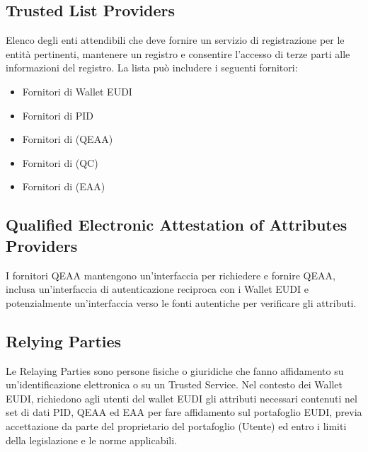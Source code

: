 \subsection{Trusted List Providers}
Elenco degli enti attendibili che deve fornire un servizio di registrazione per le entità pertinenti, mantenere un registro e consentire l'accesso di terze parti alle informazioni del registro.
La lista può includere i seguenti fornitori:
\begin{itemize}
    \item Fornitori di Wallet EUDI
    \item Fornitori di PID
    \item Fornitori di (QEAA)
    \item Fornitori di (QC)
    \item Fornitori di (EAA)
\end{itemize}
\subsection{Qualified Electronic Attestation of Attributes Providers}
I fornitori QEAA mantengono un'interfaccia per richiedere e fornire QEAA, inclusa un'interfaccia di autenticazione reciproca con i Wallet EUDI e potenzialmente un'interfaccia verso le fonti autentiche per verificare gli attributi.
\subsection{Relying Parties}
Le Relaying Parties sono persone fisiche o giuridiche che fanno affidamento su un'identificazione elettronica o su un Trusted Service.
Nel contesto dei Wallet EUDI, richiedono agli utenti del wallet EUDI gli attributi necessari contenuti nel set di dati PID, QEAA ed EAA per fare affidamento sul portafoglio EUDI, previa accettazione da parte del proprietario del portafoglio (Utente) ed entro i limiti della legislazione e le norme applicabili.
